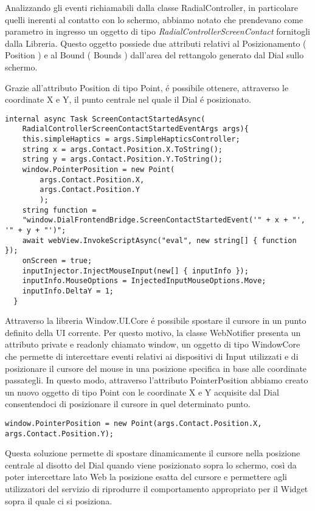 Analizzando gli eventi richiamabili dalla classe RadialController, in particolare quelli inerenti al contatto con lo schermo, abbiamo notato che prendevano come parametro in ingresso un oggetto di tipo \emph{RadialControllerScreenContact} fornitogli dalla Libreria. 
Questo oggetto possiede due attributi relativi al Posizionamento ( Position ) e al Bound ( Bounds ) dall'area del rettangolo generato dal Dial sullo schermo.

Grazie all’attributo Position di tipo Point, é possibile ottenere, attraverso le coordinate X e Y, il punto centrale nel quale il Dial é posizionato.

\vspace{1.0cm}
\begin{lstlisting}[caption={Metodo ScreenContactStartedAsync},style=javaScriptCode]
 internal async Task ScreenContactStartedAsync(
 	RadialControllerScreenContactStartedEventArgs args){
    this.simpleHaptics = args.SimpleHapticsController;
    string x = args.Contact.Position.X.ToString();
    string y = args.Contact.Position.Y.ToString();
    window.PointerPosition = new Point(
    	args.Contact.Position.X, 
    	args.Contact.Position.Y
    	);
    string function = 
    "window.DialFrontendBridge.ScreenContactStartedEvent('" + x + "', '" + y + "')";
    await webView.InvokeScriptAsync("eval", new string[] { function });
    onScreen = true;
    inputInjector.InjectMouseInput(new[] { inputInfo });
    inputInfo.MouseOptions = InjectedInputMouseOptions.Move;
    inputInfo.DeltaY = 1;
  }
\end{lstlisting} 
\vspace{1.0cm}

Attraverso la libreria Window.UI.Core é possibile spostare il cursore in un punto definito della UI corrente. Per questo motivo, la classe WebNotifier presenta un attributo private e readonly chiamato window, un oggetto di tipo WindowCore che permette di intercettare eventi relativi ai dispositivi di Input utilizzati e di posizionare il cursore del mouse in una posizione specifica in base alle coordinate passategli. In questo modo, attraverso l’attributo PointerPosition abbiamo creato un nuovo oggetto di tipo Point con le coordinate X e Y acquisite dal Dial consentendoci di posizionare il cursore in quel determinato punto.
\vspace{1.0cm}
\begin{lstlisting}[caption={Spostamento cursore},style=javaScriptCode]
  window.PointerPosition = new Point(args.Contact.Position.X, args.Contact.Position.Y);
\end{lstlisting} 
\vspace{1.0cm}
Questa soluzione permette di spostare dinamicamente il cursore nella posizione centrale al disotto del Dial quando viene posizionato sopra lo schermo, così da poter intercettare lato Web la posizione esatta del cursore e permettere agli utilizzatori del servizio di riprodurre il comportamento appropriato per il Widget sopra il quale ci si posiziona.\\

